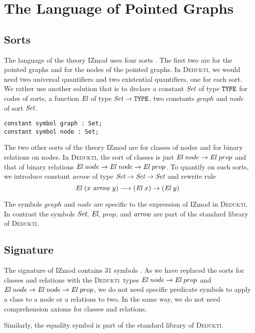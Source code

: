 \documentclass[submission,copyright,creativecommons]{eptcs}
\def\Type{\mbox{\tt TYPE}}
\def\ra{\rightarrow}
\def\lra{\longrightarrow}
\def\Set{\mbox{\it Set}}
\def\El{{\mbox{\it El}}}
\newcommand{\dedukti}{\textsc{Dedukti}}
\def\arr{{\mbox{\it arrow}}}
\begin{document}
\section{The Language of Pointed Graphs}

\subsection{Sorts}

The language of the theory IZmod uses four sorts \cite[see Section 3.2]{zermodulo}. The first two are for
the pointed graphs and for the nodes of the pointed graphs.  In
\dedukti, we would need two universal quantifiers and two
existential quantifiers, one for each sort.  We rather use another
solution \cite{theoryU} that is to declare a constant $\Set$ of type
$\Type$ for codes of sorts, a function $\El$ of type $\Set \ra \Type$,
two constants $graph$ and $node$ of sort $\Set$.

\begin{lstlisting}
constant symbol graph : Set;
constant symbol node : Set;
\end{lstlisting}

The two other sorts of the theory IZmod are for classes of nodes and
for binary relations on nodes.  In \dedukti, the sort of classes is
just $\El~node \ra \El~prop$ and that of binary relations
$\El~node \ra \El~node \ra \El~prop$. To quantify on such sorts, we introduce constant $\arr $ of type
$\Set \ra \Set \ra \Set$ and rewrite rule
$$\El~(x~\arr~y) \lra (\El~x) \ra (\El~y)$$

The symbols $graph$ and $node$ are specific to the
expression of IZmod in \dedukti. In contrast the symbols $\Set$,
$\El$, $prop$, and $\arr$ are part of the standard library of 
\dedukti.

\subsection{Signature}

The signature of IZmod contains 31 symbols \cite[see Table 2]{zermodulo}. As we have replaced the
sorts for classes and relations with the \dedukti \ types
$\El~node \ra \El~prop$ and $\El~node \ra \El~node \ra \El~prop$, we do not need specific predicate symbols to apply a class to a node or a relations to two. In the same way, we do not need comprehension axioms for classes and relations. 

Similarly, the equality symbol is part of the standard library of \dedukti.
\end{document}
